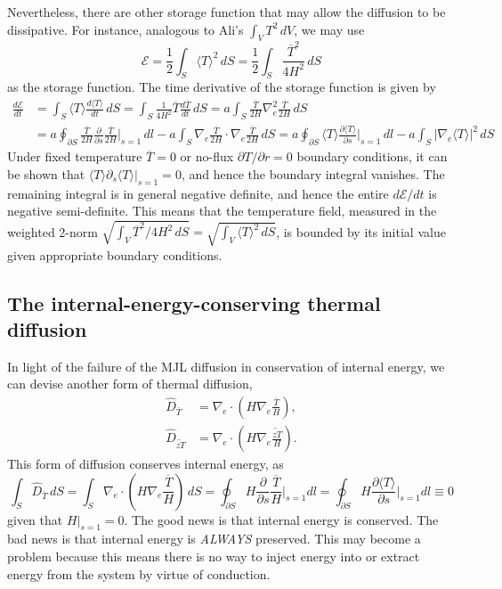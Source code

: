 Nevertheless, there are other storage function that may allow the diffusion to be dissipative. For instance, analogous to Ali's $\int_V T^2 \, dV$, we may use
\[
    \mathcal{E} = \frac{1}{2} \int_{S} \langle T \rangle^2 \, dS = \frac{1}{2} \int_{S} \frac{\overline{T}^2}{4H^2} \, dS
\]
as the storage function. The time derivative of the storage function is given by
\[\begin{aligned}
    \frac{d\mathcal{E}}{dt} 
    &= \int_S \langle T \rangle \frac{d \langle T \rangle}{dt} \, dS = \int_S \frac{1}{4H^2}\overline{T} \frac{d\overline{T}}{dt} \, dS = a\int_S \frac{\overline{T}}{2H} \nabla_e^2 \frac{\overline{T}}{2H} \, dS \\
    &= a \oint_{\partial S} \frac{\overline{T}}{2H} \frac{\partial}{\partial s} \frac{\overline{T}}{2H}\bigg|_{s=1} \, dl - a \int_S \nabla_e \frac{\overline{T}}{2H} \cdot \nabla_e \frac{\overline{T}}{2H} \, dS = a \oint_{\partial S} \langle T \rangle \frac{\partial \langle T \rangle}{\partial s}\bigg|_{s=1} \, dl - a \int_S |\nabla_e \langle T \rangle |^2 \, dS
\end{aligned}\]
Under fixed temperature $\overline{T} = 0$ or no-flux $\partial T/\partial r = 0$ boundary conditions, it can be shown that $\langle T \rangle \partial_s \langle T \rangle |_{s=1} = 0$, and hence the boundary integral vanishes. The remaining integral is in general negative definite, and hence the entire $d\mathcal{E}/dt$ is negative semi-definite.
This means that the temperature field, measured in the weighted 2-norm $\sqrt{\int_V \overline{T}^2/4H^2 \, dS} = \sqrt{\int_V \langle T \rangle^2 \, dS}$, is bounded by its initial value given appropriate boundary conditions.


\subsection{The internal-energy-conserving thermal diffusion}

In light of the failure of the MJL diffusion in conservation of internal energy, we can devise another form of thermal diffusion,
\begin{equation}\label{eqn:diff-T-PG-conserve}
\begin{aligned}
    \hat{D}_{\overline{T}} &= \nabla_e \cdot \left(H \nabla_e \frac{\overline{T}}{H}\right), \\
    \hat{D}_{\widetilde{zT}} &= \nabla_e \cdot \left(H \nabla_e \frac{\widetilde{zT}}{H}\right).
\end{aligned}
\end{equation}
This form of diffusion conserves internal energy, as
\[
    \int_S \hat{D}_{\overline{T}} \, dS = \int_S \nabla_e \cdot \left(H \nabla_e \frac{\overline{T}}{H}\right) \, dS = \oint_{\partial S} H \frac{\partial}{\partial s} \frac{\overline{T}}{H} \bigg|_{s=1} dl = \oint_{\partial S} H \frac{\partial \langle T \rangle}{\partial s}\bigg|_{s=1} dl \equiv 0
\]
given that $H|_{s=1}=0$. The good news is that internal energy is conserved. The bad news is that internal energy is \textit{ALWAYS} preserved. This may become a problem because this means there is no way to inject energy into or extract energy from the system by virtue of conduction.

